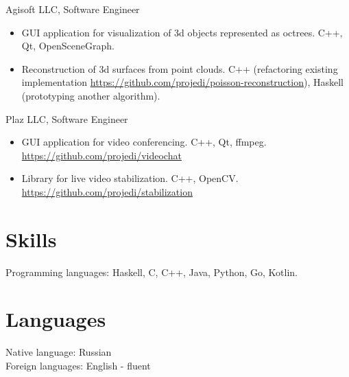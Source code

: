    Agisoft LLC, Software Engineer
   \begin{itemize}
      \itemsep 0cm
      \item GUI application for visualization of 3d objects represented as octrees.
            C++, Qt, OpenSceneGraph.
      \item Reconstruction of 3d surfaces from point clouds.
            C++ (refactoring existing implementation
            \url{https://github.com/projedi/poisson-reconstruction}),
            Haskell (prototyping another algorithm).
   \end{itemize}
   Plaz LLC, Software Engineer
   \begin{itemize}
      \itemsep 0cm
      \item GUI application for video conferencing. C++, Qt, ffmpeg.\\
            \url{https://github.com/projedi/videochat}
      \item Library for live video stabilization. C++, OpenCV.\\
            \url{https://github.com/projedi/stabilization}
   \end{itemize}

\section*{Skills}

Programming languages: Haskell, C, C++, Java, Python, Go, Kotlin.

\section*{Languages}
Native language: Russian\\
Foreign languages: English - fluent
